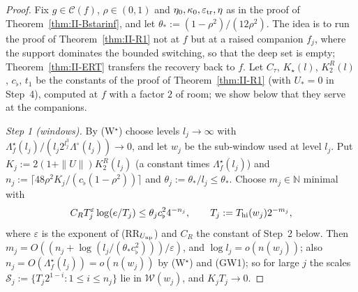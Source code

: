 \documentclass[10pt]{amsart}
\theoremstyle{definition}
\theoremstyle{remark}
\newcommand{\N}{\mathbb N}
\newcommand{\Cset}{\mathcal C}
\begin{document}
\begin{proof}
Fix $g\in\Cset(f)$, $\rho\in(0,1)$ and $\eta_0,\kappa_0,\varepsilon_{\rm tr},
\eta$ as in the proof of Theorem~\ref{thm:II-Bstarinf}, and let
$\theta_*:=(1-\rho^2)/(12\rho^2)$.  The idea is to run the proof of
Theorem~\ref{thm:II-R1} not at $f$ but at a raised companion $f_j$, where
the support dominates the bounded switching, so that the deep set is empty;
Theorem~\ref{thm:II-ERT} transfers the recovery back to $f$.  Let
$C_\tau$, $K_\star(l)$, $K^R_2(l)$, $c_\flat$, $t_1$ be the constants of the
proof of Theorem~\ref{thm:II-R1} (with $U_*=0$ in Step~4), computed at $f$ with
a factor $2$ of room; we show below that they serve at the companions.

\emph{Step 1 (windows).}  By (W$^\star$) choose levels $l_j\to\infty$ with
$\Lambda^\star_f(l_j)/(l_j2^{l_j^3}\Lambda^\circ(l_j))\to0$, and let $w_j$ be
the sub-window used at level $l_j$.  Put $K_j:=2(1+\|U\|)K^R_2(l_j)$
(a constant times $\Lambda^\star_f(l_j)$) and $n_j:=\lceil48\rho^2K_j/
(c_\flat(1-\rho^2))\rceil$ and $\theta_j:=\theta_*/l_j\le\theta_*$.  Choose
$m_j\in\N$ minimal with
\[
 C_RT_j^\varepsilon\log(e/T_j)\le\theta_jc_\flat^24^{-n_j},\qquad
 T_j:=T_{\rm hi}(w_j)2^{-m_j},
\]
where $\varepsilon$ is the exponent of (RR$_{U_{\rm np}}$) and $C_R$ the
constant of Step~2 below.  Then $m_j=O((n_j+\log(l_j/(\theta_*c_\flat^2)))/
\varepsilon)$, and $\log l_j=o(n(w_j))$; also
$n_j=O(\Lambda^\star_f(l_j))=o(n(w_j))$ by (W$^\star$) and (GW1); so for large
$j$ the scales $\mathcal S_j:=\{T_j2^{1-i}:1\le i\le n_j\}$ lie in
$\mathcal W(w_j)$, and $K_jT_j\to0$.


\end{proof}
\end{document}
